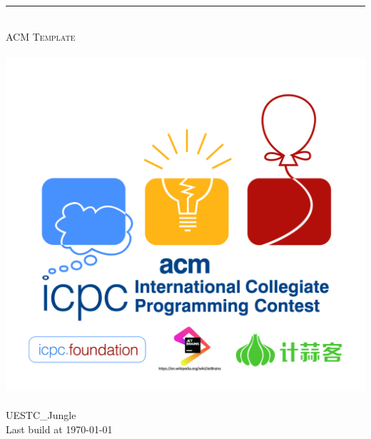 \begin{titlepage}
	\pagestyle{empty}

  \begin{center}
		~\\[80pt]
    \hrule\ \\[8pt]
    \fontsize{48pt}{\baselineskip}\selectfont  \textsc{ACM Template}\\[8pt]
    ~\\[20pt]
    \includegraphics[scale=1]{./acm.jpg}
    ~\\[20pt]
    \huge UESTC\_Jungle\\[8pt]
    \Large Last build at \today
  \end{center}
\end{titlepage}
\restoregeometry